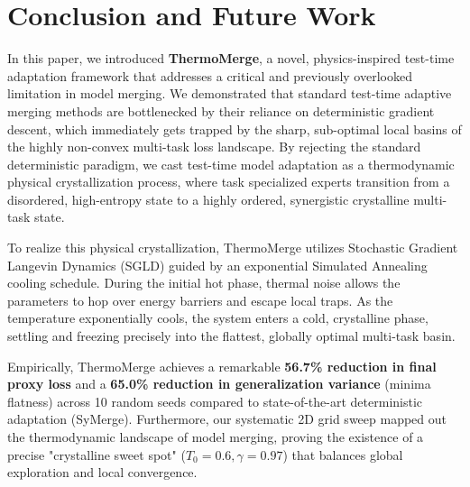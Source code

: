 \section{Conclusion and Future Work}
\label{sec:conclusion}

In this paper, we introduced \textbf{ThermoMerge}, a novel, physics-inspired test-time adaptation framework that addresses a critical and previously overlooked limitation in model merging.
We demonstrated that standard test-time adaptive merging methods are bottlenecked by their reliance on deterministic gradient descent, which immediately gets trapped by the sharp, sub-optimal local basins of the highly non-convex multi-task loss landscape.
By rejecting the standard deterministic paradigm, we cast test-time model adaptation as a thermodynamic physical crystallization process, where task specialized experts transition from a disordered, high-entropy state to a highly ordered, synergistic crystalline multi-task state.

To realize this physical crystallization, ThermoMerge utilizes Stochastic Gradient Langevin Dynamics (SGLD) guided by an exponential Simulated Annealing cooling schedule.
During the initial hot phase, thermal noise allows the parameters to hop over energy barriers and escape local traps.
As the temperature exponentially cools, the system enters a cold, crystalline phase, settling and freezing precisely into the flattest, globally optimal multi-task basin.

Empirically, ThermoMerge achieves a remarkable \textbf{56.7\% reduction in final proxy loss} and a \textbf{65.0\% reduction in generalization variance} (minima flatness) across 10 random seeds compared to state-of-the-art deterministic adaptation (SyMerge).
Furthermore, our systematic 2D grid sweep mapped out the thermodynamic landscape of model merging, proving the existence of a precise "crystalline sweet spot" ($T_0 = 0.6, \gamma = 0.97$) that balances global exploration and local convergence.

